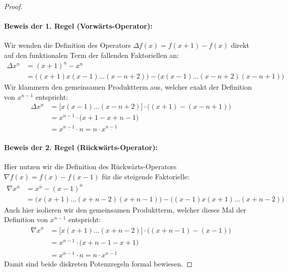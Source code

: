 \documentclass{article}
\theoremstyle{definition}
\begin{document}
\begin{proof}
\quad
\paragraph{Beweis der 1. Regel (Vorwärts-Operator):}
Wir wenden die Definition des Operators $\Delta f(x) = f(x+1) - f(x)$ direkt auf den funktionalen Term der fallenden Faktoriellen an:
\begin{align*}
    \Delta x^{\underline{n}} &= (x+1)^{\underline{n}} - x^{\underline{n}} \\
    &= \Big( (x+1)x(x-1)\dots(x-n+2) \Big) - \Big( x(x-1)\dots(x-n+2)(x-n+1) \Big)
\end{align*}
Wir klammern den gemeinsamen Produktterm aus, welcher exakt der Definition von $x^{\underline{n-1}}$ entspricht:
\begin{align*}
    \Delta x^{\underline{n}} &= \Big[ x(x-1)\dots(x-n+2) \Big] \cdot \Big( (x+1) - (x-n+1) \Big) \\
    &= x^{\underline{n-1}} \cdot \big( x + 1 - x + n - 1 \big) \\
    &= x^{\underline{n-1}} \cdot n = n \cdot x^{\underline{n-1}}
\end{align*}

\paragraph{Beweis der 2. Regel (Rückwärts-Operator):}
Hier nutzen wir die Definition des Rückwärts-Operators $\nabla f(x) = f(x) - f(x-1)$ für die steigende Faktorielle:
\begin{align*}
    \nabla x^{\overline{n}} &= x^{\overline{n}} - (x-1)^{\overline{n}} \\
    &= \Big( x(x+1)\dots(x+n-2)(x+n-1) \Big) - \Big( (x-1)x(x+1)\dots(x+n-2) \Big)
\end{align*}
Auch hier isolieren wir den gemeinsamen Produktterm, welcher dieses Mal der Definition von $x^{\overline{n-1}}$ entspricht:
\begin{align*}
    \nabla x^{\overline{n}} &= \Big[ x(x+1)\dots(x+n-2) \Big] \cdot \Big( (x+n-1) - (x-1) \Big) \\
    &= x^{\overline{n-1}} \cdot \big( x + n - 1 - x + 1 \big) \\
    &= x^{\overline{n-1}} \cdot n = n \cdot x^{\overline{n-1}}
\end{align*}
Damit sind beide diskreten Potenzregeln formal bewiesen.
\end{proof}
\end{document}
